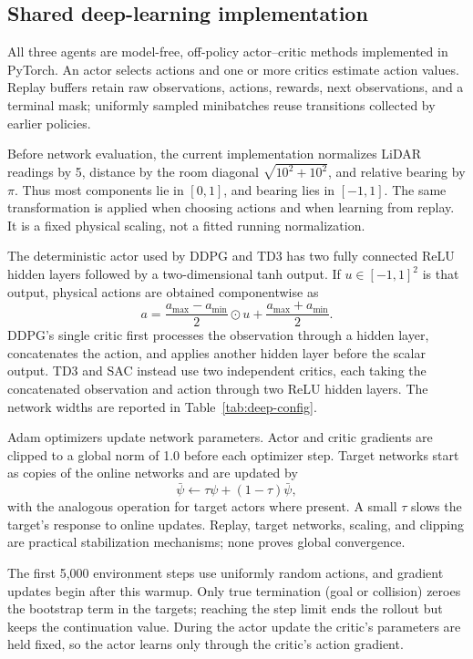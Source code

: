 \documentclass[11pt,a4paper]{article}
\theoremstyle{definition}
\theoremstyle{plain}
\theoremstyle{remark}
\begin{document}
\subsection{Shared deep-learning implementation}
\label{sec:deep-implementation}

All three agents are model-free, off-policy actor--critic methods implemented in PyTorch. An actor selects actions and one or more critics estimate action values. Replay buffers retain raw observations, actions, rewards, next observations, and a terminal mask; uniformly sampled minibatches reuse transitions collected by earlier policies.

Before network evaluation, the current implementation normalizes LiDAR readings by 5, distance by the room diagonal $\sqrt{10^2+10^2}$, and relative bearing by $\pi$. Thus most components lie in $[0,1]$, and bearing lies in $[-1,1]$. The same transformation is applied when choosing actions and when learning from replay. It is a fixed physical scaling, not a fitted running normalization.

The deterministic actor used by DDPG and TD3 has two fully connected ReLU hidden layers followed by a two-dimensional tanh output. If $u\in[-1,1]^2$ is that output, physical actions are obtained componentwise as
\begin{equation}
 a=\frac{a_{\max}-a_{\min}}{2}\odot u+
       \frac{a_{\max}+a_{\min}}{2}.
\end{equation}
DDPG's single critic first processes the observation through a hidden layer, concatenates the action, and applies another hidden layer before the scalar output. TD3 and SAC instead use two independent critics, each taking the concatenated observation and action through two ReLU hidden layers. The network widths are reported in Table~\ref{tab:deep-config}.

Adam optimizers update network parameters. Actor and critic gradients are clipped to a global norm of 1.0 before each optimizer step. Target networks start as copies of the online networks and are updated by
\begin{equation}
 \bar\psi\leftarrow\tau\psi+(1-\tau)\bar\psi,
 \label{eq:polyak}
\end{equation}
with the analogous operation for target actors where present. A small $\tau$ slows the target's response to online updates. Replay, target networks, scaling, and clipping are practical stabilization mechanisms; none proves global convergence.

The first 5,000 environment steps use uniformly random actions, and gradient updates begin after this warmup. Only true termination (goal or collision) zeroes the bootstrap term in the targets; reaching the step limit ends the rollout but keeps the continuation value. During the actor update the critic's parameters are held fixed, so the actor learns only through the critic's action gradient.
\end{document}
